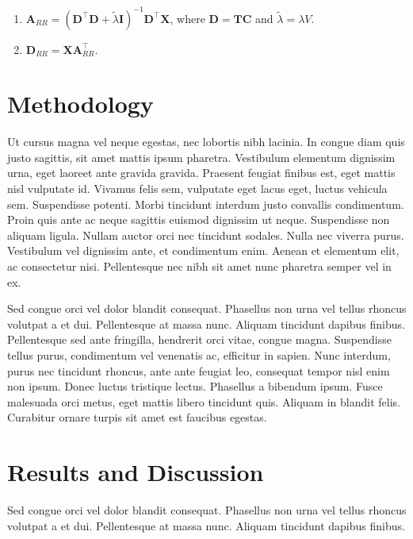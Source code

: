 \documentclass[a4paper, 11pt]{article}
\def\*#1{\mathbf{#1}}
\begin{document}
\begin{enumerate}
    \item $ \*A_{RR} = (\*D^\top \*D + \tilde{\lambda} \*I )^{-1} \*D^\top \*X $, where $ \*D = \*{TC}$ and $\tilde{\lambda} = \lambda V$.
    \item $ \*D_{RR} = \*X \*A^\top_{RR}$.
    
\end{enumerate}

\section{Methodology}
\label{section:methodology}

Ut cursus magna vel neque egestas, nec lobortis nibh lacinia. In congue diam quis justo sagittis, sit amet mattis ipsum pharetra. Vestibulum elementum dignissim urna, eget laoreet ante gravida gravida. Praesent feugiat finibus est, eget mattis nisl vulputate id. Vivamus felis sem, vulputate eget lacus eget, luctus vehicula sem. Suspendisse potenti. Morbi tincidunt interdum justo convallis condimentum. Proin quis ante ac neque sagittis euismod dignissim ut neque. Suspendisse non aliquam ligula. Nullam auctor orci nec tincidunt sodales. Nulla nec viverra purus. Vestibulum vel dignissim ante, et condimentum enim. Aenean et elementum elit, ac consectetur nisi. Pellentesque nec nibh sit amet nunc pharetra semper vel in ex.

Sed congue orci vel dolor blandit consequat. Phasellus non urna vel tellus rhoncus volutpat a et dui. Pellentesque at massa nunc. Aliquam tincidunt dapibus finibus. Pellentesque sed ante fringilla, hendrerit orci vitae, congue magna. Suspendisse tellus purus, condimentum vel venenatis ac, efficitur in sapien. Nunc interdum, purus nec tincidunt rhoncus, ante ante feugiat leo, consequat tempor nisl enim non ipsum. Donec luctus tristique lectus. Phasellus a bibendum ipsum. Fusce malesuada orci metus, eget mattis libero tincidunt quis. Aliquam in blandit felis. Curabitur ornare turpis sit amet est faucibus egestas.

\section{Results and Discussion}
\label{section:methodology}

Sed congue orci vel dolor blandit consequat. Phasellus non urna vel tellus rhoncus volutpat a et dui. Pellentesque at massa nunc. Aliquam tincidunt dapibus finibus.
\end{document}
